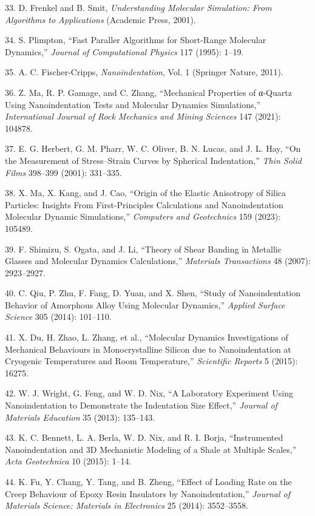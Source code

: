 \documentclass{article}
\begin{document}
\begin{hangpars}
33. D. Frenkel and B. Smit, \emph{Understanding Molecular Simulation: From Algorithms to Applications} (Academic Press, 2001).

34. S. Plimpton, “Fast Paraller Algorithms for Short-Range Molecular Dynamics,” \emph{Journal of Computational Physics} 117 (1995): 1–19.

35. A. C. Fischer-Cripps, \emph{Nanoindentation}, Vol. 1 (Springer Nature, 2011).

36. Z. Ma, R. P. Gamage, and C. Zhang, “Mechanical Properties of α-Quartz Using Nanoindentation Tests and Molecular Dynamics Simulations,” \emph{International Journal of Rock Mechanics and Mining Sciences} 147 (2021): 104878.

37. E. G. Herbert, G. M. Pharr, W. C. Oliver, B. N. Lucas, and J. L. Hay, “On the Measurement of Stress–Strain Curves by Spherical Indentation,” \emph{Thin Solid Films} 398–399 (2001): 331–335.

38. X. Ma, X. Kang, and J. Cao, “Origin of the Elastic Anisotropy of Silica Particles: Insights From First-Principles Calculations and Nanoindentation Molecular Dynamic Simulations,” \emph{Computers and Geotechnics} 159 (2023): 105489.

39. F. Shimizu, S. Ogata, and J. Li, “Theory of Shear Banding in Metallic Glasses and Molecular Dynamics Calculations,” \emph{Materials Transactions} 48 (2007): 2923–2927.

40. C. Qiu, P. Zhu, F. Fang, D. Yuan, and X. Shen, “Study of Nanoindentation Behavior of Amorphous Alloy Using Molecular Dynamics,” \emph{Applied Surface Science} 305 (2014): 101–110.

41. X. Du, H. Zhao, L. Zhang, et al., “Molecular Dynamics Investigations of Mechanical Behaviours in Monocrystalline Silicon due to Nanoindentation at Cryogenic Temperatures and Room Temperature,” \emph{Scientific Reports} 5 (2015): 16275.

42. W. J. Wright, G. Feng, and W. D. Nix, “A Laboratory Experiment Using Nanoindentation to Demonstrate the Indentation Size Effect,” \emph{Journal of Materials Education} 35 (2013): 135–143.

43. K. C. Bennett, L. A. Berla, W. D. Nix, and R. I. Borja, “Instrumented Nanoindentation and 3D Mechanistic Modeling of a Shale at Multiple Scales,” \emph{Acta Geotechnica} 10 (2015): 1–14.

44. K. Fu, Y. Chang, Y. Tang, and B. Zheng, “Effect of Loading Rate on the Creep Behaviour of Epoxy Resin Insulators by Nanoindentation,” \emph{Journal of Materials Science: Materials in Electronics} 25 (2014): 3552–3558.


\end{hangpars}
\end{document}
